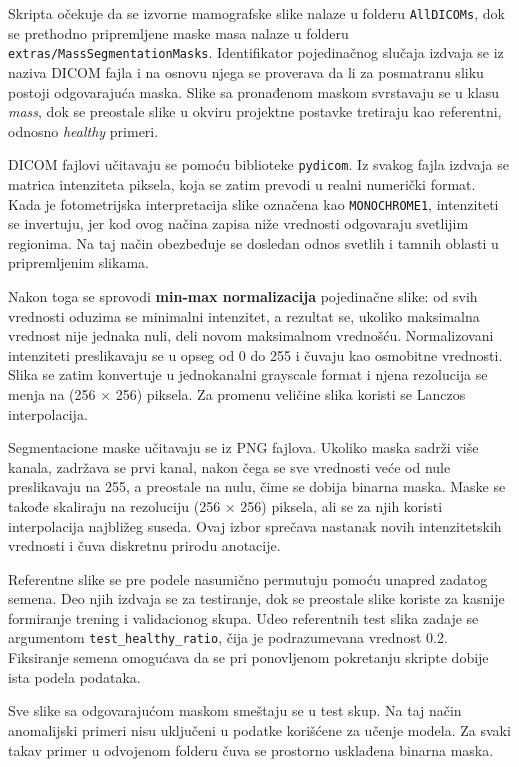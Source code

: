 \documentclass[10pt]{article}
\begin{document}
	Skripta očekuje da se izvorne mamografske slike nalaze u folderu \texttt{AllDICOMs}, dok se prethodno pripremljene maske masa nalaze u folderu \texttt{extras/MassSegmentationMasks}. Identifikator pojedinačnog slučaja izdvaja se iz naziva DICOM fajla i na osnovu njega se proverava da li za posmatranu sliku postoji odgovarajuća maska. Slike sa pronađenom maskom svrstavaju se u klasu \textit{mass}, dok se preostale slike u okviru projektne postavke tretiraju kao referentni, odnosno \textit{healthy} primeri.
	
	DICOM fajlovi učitavaju se pomoću biblioteke \texttt{pydicom}. Iz svakog fajla izdvaja se matrica intenziteta piksela, koja se zatim prevodi u realni numerički format. Kada je fotometrijska interpretacija slike označena kao \texttt{MONOCHROME1}, intenziteti se invertuju, jer kod ovog načina zapisa niže vrednosti odgovaraju svetlijim regionima. Na taj način obezbeđuje se dosledan odnos svetlih i tamnih oblasti u pripremljenim slikama.
	
	Nakon toga se sprovodi \textbf{min-max normalizacija} pojedinačne slike: od svih vrednosti oduzima se minimalni intenzitet, a rezultat se, ukoliko maksimalna vrednost nije jednaka nuli, deli novom maksimalnom vrednošću. Normalizovani intenziteti preslikavaju se u opseg od 0 do 255 i čuvaju kao osmobitne vrednosti. Slika se zatim konvertuje u jednokanalni grayscale format i njena rezolucija se menja na (256 $\times$ 256) piksela. Za promenu veličine slika koristi se Lanczos interpolacija.
	
	Segmentacione maske učitavaju se iz PNG fajlova. Ukoliko maska sadrži više kanala, zadržava se prvi kanal, nakon čega se sve vrednosti veće od nule preslikavaju na 255, a preostale na nulu, čime se dobija binarna maska. Maske se takođe skaliraju na rezoluciju (256 $\times$ 256) piksela, ali se za njih koristi interpolacija najbližeg suseda. Ovaj izbor sprečava nastanak novih intenzitetskih vrednosti i čuva diskretnu prirodu anotacije.
	
	Referentne slike se pre podele nasumično permutuju pomoću unapred zadatog semena. Deo njih izdvaja se za testiranje, dok se preostale slike koriste za kasnije formiranje trening i validacionog skupa. Udeo referentnih test slika zadaje se argumentom \texttt{test\_healthy\_ratio}, čija je podrazumevana vrednost 0.2. Fiksiranje semena omogućava da se pri ponovljenom pokretanju skripte dobije ista podela podataka.
	
	Sve slike sa odgovarajućom maskom smeštaju se u test skup. Na taj način anomalijski primeri nisu uključeni u podatke korišćene za učenje modela. Za svaki takav primer u odvojenom folderu čuva se prostorno usklađena binarna maska. \newline
	
\end{document}
